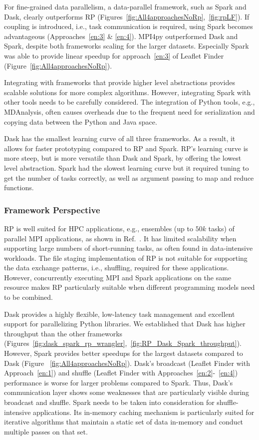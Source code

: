 For fine-grained data parallelism, a data-parallel framework, such as Spark and
Dask, clearly outperforms RP
(Figures~\ref{fig:All4approachesNoRp},~\ref{fig:rpLF}). If coupling is
introduced, i.e., task communication is required, using Spark becomes
advantageous (Approaches~\ref{en:3} \& \ref{en:4}). MPI4py outperformed
Dask and Spark, despite both frameworks scaling for the larger datasets.
Especially Spark was able to provide linear speedup for approach~\ref{en:3} of
Leaflet Finder (Figure~\ref{fig:All4approachesNoRp}).

Integrating with frameworks that provide higher level abstractions provides
scalable solutions for more complex algorithms. However, integrating Spark with
other tools needs to be carefully considered. The integration of Python tools,
e.g., MDAnalysis, often causes overheads due to the frequent need for
serialization and copying data between the Python and Java space.

Dask has the smallest learning curve of all three frameworks. As a result, it
allows for faster prototyping compared to RP and Spark.
RP's learning curve is more steep, but is more versatile than Dask
and Spark, by offering the lowest level abstraction. Spark had the slowest
learning curve but it required tuning to get the number of tasks correctly, as
well as argument passing to map and reduce functions.

\subsubsection*{Framework Perspective}

RP is well suited for HPC applications, e.g., ensembles (up to $50k$
tasks) of parallel MPI applications, as shown in
Ref.~\cite{merzky2018design,merzky2019using}. It has limited scalability when
supporting large numbers of short-running tasks, as often found in
data-intensive workloads. The file staging implementation of RP is
not suitable for supporting the data exchange patterns, i.e., shuffling, required
for these applications. However, concurrently executing MPI and Spark applications
on the same resource makes RP particularly suitable when different
programming models need to be combined.

Dask provides a highly flexible, low-latency task management and excellent
support for parallelizing Python libraries. We established that Dask has higher
throughput than the other frameworks
(Figures~\ref{fig:dask_spark_rp_wrangler},~\ref{fig:RP_Dask_Spark_throughput}).
However, Spark provides better speedups for the largest datasets compared to
Dask (Figure ~\ref{fig:All4approachesNoRp}). Dask's broadcast (Leaflet Finder
with Approach~\ref{en:1}) and shuffle (Leaflet Finder with
Approaches~\ref{en:2}-~\ref{en:4}) performance is worse for larger problems
compared to Spark. Thus, Dask's communication layer shows some weaknesses that
are particularly visible during broadcast and shuffle. Spark needs to be taken
into consideration for shuffle-intensive applications. Its in-memory caching
mechanism is particularly suited for iterative algorithms that maintain a static
set of data in-memory and conduct multiple passes on that set.

